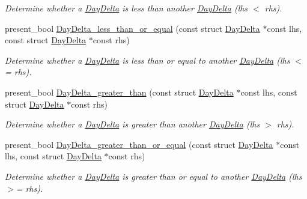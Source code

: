 \begin{DoxyCompactItemize}
\begin{DoxyCompactList}\small\item\em \-Determine whether a \hyperlink{structDayDelta}{\-Day\-Delta} is less than another \hyperlink{structDayDelta}{\-Day\-Delta} (lhs $<$ rhs). \end{DoxyCompactList}\item 
present\-\_\-bool \hyperlink{day-delta_8h_ad8c2d0d57be8633a7c47eaf7d5d018b0}{\-Day\-Delta\-\_\-less\-\_\-than\-\_\-or\-\_\-equal} (const struct \hyperlink{structDayDelta}{\-Day\-Delta} $\ast$const lhs, const struct \hyperlink{structDayDelta}{\-Day\-Delta} $\ast$const rhs)
\begin{DoxyCompactList}\small\item\em \-Determine whether a \hyperlink{structDayDelta}{\-Day\-Delta} is less than or equal to another \hyperlink{structDayDelta}{\-Day\-Delta} (lhs $<$= rhs). \end{DoxyCompactList}\item 
present\-\_\-bool \hyperlink{day-delta_8h_a3be314820557dbfce261dce0cfec5f6d}{\-Day\-Delta\-\_\-greater\-\_\-than} (const struct \hyperlink{structDayDelta}{\-Day\-Delta} $\ast$const lhs, const struct \hyperlink{structDayDelta}{\-Day\-Delta} $\ast$const rhs)
\begin{DoxyCompactList}\small\item\em \-Determine whether a \hyperlink{structDayDelta}{\-Day\-Delta} is greater than another \hyperlink{structDayDelta}{\-Day\-Delta} (lhs $>$ rhs). \end{DoxyCompactList}\item 
present\-\_\-bool \hyperlink{day-delta_8h_aa9e880711e48d109025c051544d630d4}{\-Day\-Delta\-\_\-greater\-\_\-than\-\_\-or\-\_\-equal} (const struct \hyperlink{structDayDelta}{\-Day\-Delta} $\ast$const lhs, const struct \hyperlink{structDayDelta}{\-Day\-Delta} $\ast$const rhs)
\begin{DoxyCompactList}\small\item\em \-Determine whether a \hyperlink{structDayDelta}{\-Day\-Delta} is greater than or equal to another \hyperlink{structDayDelta}{\-Day\-Delta} (lhs $>$= rhs). \end{DoxyCompactList}\end{DoxyCompactItemize}


